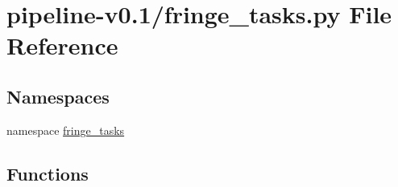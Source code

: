 \hypertarget{pipeline-v0_81_2fringe__tasks_8py}{\section{pipeline-\/v0.1/fringe\-\_\-tasks.py \-File \-Reference}
\label{pipeline-v0_81_2fringe__tasks_8py}
}
\subsection*{\-Namespaces}
\begin{DoxyCompactItemize}
\item 
namespace \hyperlink{namespacefringe__tasks}{fringe\-\_\-tasks}
\end{DoxyCompactItemize}
\subsection*{\-Functions}
